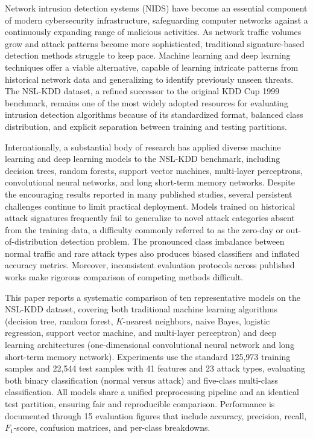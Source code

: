 \begin{background}
Network intrusion detection systems (NIDS) have become an essential component of modern cybersecurity infrastructure, safeguarding computer networks against a continuously expanding range of malicious activities. As network traffic volumes grow and attack patterns become more sophisticated, traditional signature-based detection methods struggle to keep pace. Machine learning and deep learning techniques offer a viable alternative, capable of learning intricate patterns from historical network data and generalizing to identify previously unseen threats. The NSL-KDD dataset, a refined successor to the original KDD Cup 1999 benchmark, remains one of the most widely adopted resources for evaluating intrusion detection algorithms because of its standardized format, balanced class distribution, and explicit separation between training and testing partitions.

Internationally, a substantial body of research has applied diverse machine learning and deep learning models to the NSL-KDD benchmark, including decision trees, random forests, support vector machines, multi-layer perceptrons, convolutional neural networks, and long short-term memory networks. Despite the encouraging results reported in many published studies, several persistent challenges continue to limit practical deployment. Models trained on historical attack signatures frequently fail to generalize to novel attack categories absent from the training data, a difficulty commonly referred to as the zero-day or out-of-distribution detection problem. The pronounced class imbalance between normal traffic and rare attack types also produces biased classifiers and inflated accuracy metrics. Moreover, inconsistent evaluation protocols across published works make rigorous comparison of competing methods difficult.

This paper reports a systematic comparison of ten representative models on the NSL-KDD dataset, covering both traditional machine learning algorithms (decision tree, random forest, $K$-nearest neighbors, naive Bayes, logistic regression, support vector machine, and multi-layer perceptron) and deep learning architectures (one-dimensional convolutional neural network and long short-term memory network). Experiments use the standard 125{,}973 training samples and 22{,}544 test samples with 41 features and 23 attack types, evaluating both binary classification (normal versus attack) and five-class multi-class classification. All models share a unified preprocessing pipeline and an identical test partition, ensuring fair and reproducible comparison. Performance is documented through 15 evaluation figures that include accuracy, precision, recall, $F_1$-score, confusion matrices, and per-class breakdowns.


\end{background}
